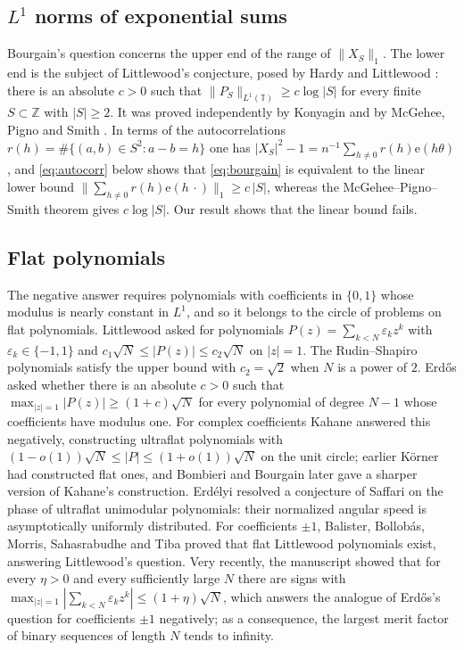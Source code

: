 \documentclass[11pt,reqno]{amsart}
\theoremstyle{definition}
\newcommand{\T}{\mathbb{T}}
\newcommand{\Z}{\mathbb{Z}}
\newcommand{\e}{\mathrm{e}}
\begin{document}
\subsection{\texorpdfstring{$L^1$}{L1} norms of exponential sums}
Bourgain's question concerns the upper end of the range of $\|X_S\|_1$. The lower end is the subject of Littlewood's conjecture, posed by Hardy and Littlewood \cite{HL48}: there is an absolute $c>0$ such that $\|P_S\|_{L^1(\T)}\ge c\log|S|$ for every finite $S\subset\Z$ with $|S|\ge2$. It was proved independently by Konyagin \cite{Kon81} and by McGehee, Pigno and Smith \cite{MPS81}. In terms of the autocorrelations $r(h)=\#\{(a,b)\in S^2:a-b=h\}$ one has $|X_S|^2-1=n^{-1}\sum_{h\ne0}r(h)\e(h\theta)$, and \eqref{eq:autocorr} below shows that \eqref{eq:bourgain} is equivalent to the linear lower bound $\|\sum_{h\ne0}r(h)\e(h\,\cdot)\|_1\ge c\,|S|$, whereas the McGehee--Pigno--Smith theorem gives $c\log|S|$. Our result shows that the linear bound fails.

\subsection{Flat polynomials}
The negative answer requires polynomials with coefficients in $\{0,1\}$ whose modulus is nearly constant in $L^1$, and so it belongs to the circle of problems on flat polynomials. Littlewood \cite{Lit66,Lit68} asked for polynomials $P(z)=\sum_{k<N}\varepsilon_kz^k$ with $\varepsilon_k\in\{-1,1\}$ and $c_1\sqrt N\le|P(z)|\le c_2\sqrt N$ on $|z|=1$. The Rudin--Shapiro polynomials \cite{Sha51,Rud59} satisfy the upper bound with $c_2=\sqrt2$ when $N$ is a power of $2$. Erd\H{o}s \cite{Erd57} asked whether there is an absolute $c>0$ such that $\max_{|z|=1}|P(z)|\ge(1+c)\sqrt N$ for every polynomial of degree $N-1$ whose coefficients have modulus one. For complex coefficients Kahane \cite{Kah80} answered this negatively, constructing ultraflat polynomials with $(1-o(1))\sqrt N\le|P|\le(1+o(1))\sqrt N$ on the unit circle; earlier K\"orner \cite{Kor80} had constructed flat ones, and Bombieri and Bourgain \cite{BB09} later gave a sharper version of Kahane's construction. Erd\'elyi \cite{Erd01} resolved a conjecture of Saffari on the phase of ultraflat unimodular polynomials: their normalized angular speed is asymptotically uniformly distributed. For coefficients $\pm1$, Balister, Bollob\'as, Morris, Sahasrabudhe and Tiba \cite{BBMST} proved that flat Littlewood polynomials exist, answering Littlewood's question. Very recently, the manuscript \cite{AMM} showed that for every $\eta>0$ and every sufficiently large $N$ there are signs with $\max_{|z|=1}|\sum_{k<N}\varepsilon_kz^k|\le(1+\eta)\sqrt N$, which answers the analogue of Erd\H{o}s's question for coefficients $\pm1$ negatively; as a consequence, the largest merit factor \cite{Gol82} of binary sequences of length $N$ tends to infinity.
\end{document}
